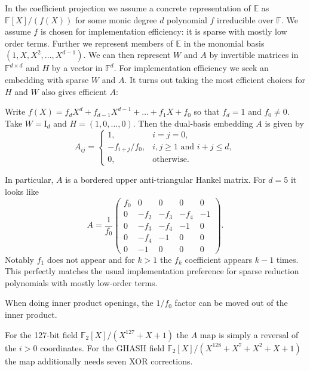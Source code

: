 \documentclass[11pt,letterpaper,usenames,dvipsnames]{article}
\begin{document}
In the coefficient projection we assume a concrete representation of $\mathbb{E}$ as $\mathbb{F}[X]/(f(X))$ for some monic degree $d$ polynomial $f$ irreducible over $\mathbb{F}$. We assume $f$ is chosen for implementation efficiency: it is sparse with mostly low order terms. Further we represent members of $\mathbb{E}$ in the monomial basis $(1, X, X^2, \dots, X^{d-1})$. We can then represent $W$ and $A$ by invertible matrices in $\mathbb{F}^{d \times d}$ and $H$ by a vector in $\mathbb{F}^d$. For implementation efficiency we seek an embedding with sparse $W$ and $A$. It turns out taking the most efficient choices for $H$ and $W$ also gives efficient $A$:

\begin{theorem}
Write  $f(X)= f_d X^d + f_{d-1} X^{d-1} + \hdots + f_1 X + f_0$ so that $f_d =1$ and $f_0 \neq 0$. Take $W=\mathrm{I}_d$ and $H=(1, 0, \dots, 0)$. Then the dual-basis embedding $A$ is given by
\[
A_{ij}=
\begin{cases}
1,&i=j=0,\\
-f_{i+j}/f_0,&i,j\ge1\text{ and }i+j\le d,\\
0,&\text{otherwise}.
\end{cases}
\]
\end{theorem}

In particular, $A$ is a bordered upper anti-triangular Hankel matrix. For $d=5$ it looks like
\[
A= \frac{1}{f_0}
\begin{pmatrix}
f_0 & 0 & 0 & 0 & 0\\
0 & -f_2 & -f_3 & -f_4 & -1\\
0 & -f_3 & -f_4 & -1 & 0\\
0 & -f_4 & -1 & 0 & 0\\
0 & -1 & 0 & 0 & 0
\end{pmatrix}.
\]
Notably $f_1$ does not appear and for $k>1$ the $f_k$ coefficient appears $k-1$ times. This perfectly matches the usual implementation preference for sparse reduction polynomials with mostly low-order terms.

When doing inner product openings, the $1/f_0$ factor can be moved out of the inner product. 

For the 127-bit field $\mathbb{F}_2[X]/(X^{127} + X + 1)$ the $A$ map is simply a reversal of the $i>0$ coordinates. For the GHASH field $\mathbb{F}_2[X]/(X^{128} + X^7 + X^2 + X + 1)$ the map additionally needs seven XOR corrections.

\end{document}
